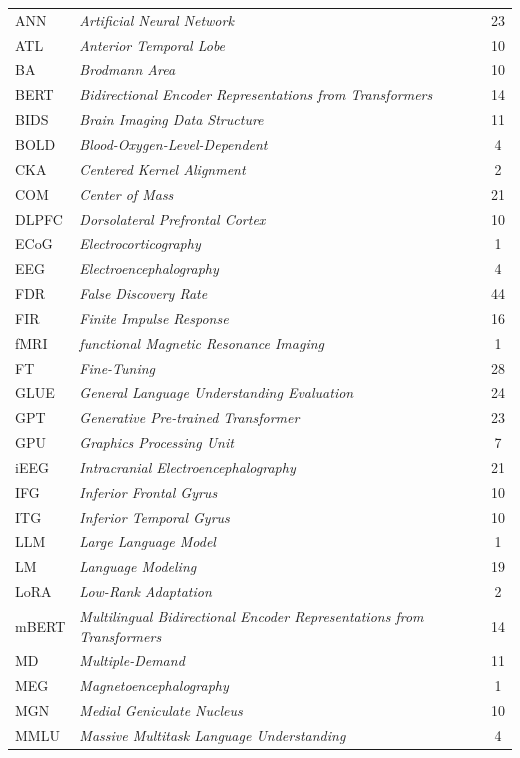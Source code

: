 \begin{longtable}{@{} l >{\raggedright\arraybackslash}p{7.5cm} c @{}}
ANN & \textit{Artificial Neural Network} & 23 \\
ATL & \textit{Anterior Temporal Lobe} & 10 \\
BA & \textit{Brodmann Area} & 10 \\
BERT & \textit{Bidirectional Encoder Representations from Transformers} & 14 \\
BIDS & \textit{Brain Imaging Data Structure} & 11 \\
BOLD & \textit{Blood-Oxygen-Level-Dependent} & 4 \\
CKA & \textit{Centered Kernel Alignment} & 2 \\
COM & \textit{Center of Mass} & 21 \\
DLPFC & \textit{Dorsolateral Prefrontal Cortex} & 10 \\
ECoG & \textit{Electrocorticography} & 1 \\
EEG & \textit{Electroencephalography} & 4 \\
FDR & \textit{False Discovery Rate} & 44 \\
FIR & \textit{Finite Impulse Response} & 16 \\
fMRI & \textit{functional Magnetic Resonance Imaging} & 1 \\
FT & \textit{Fine-Tuning} & 28 \\
GLUE & \textit{General Language Understanding Evaluation} & 24 \\
GPT & \textit{Generative Pre-trained Transformer} & 23 \\
GPU & \textit{Graphics Processing Unit} & 7 \\
iEEG & \textit{Intracranial Electroencephalography} & 21 \\
IFG & \textit{Inferior Frontal Gyrus} & 10 \\
ITG & \textit{Inferior Temporal Gyrus} & 10 \\
LLM & \textit{Large Language Model} & 1 \\
LM & \textit{Language Modeling} & 19 \\
LoRA & \textit{Low-Rank Adaptation} & 2 \\
mBERT & \textit{Multilingual Bidirectional Encoder Representations from Transformers} & 14 \\
MD & \textit{Multiple-Demand} & 11 \\
MEG & \textit{Magnetoencephalography} & 1 \\
MGN & \textit{Medial Geniculate Nucleus} & 10 \\
MMLU & \textit{Massive Multitask Language Understanding} & 4 \\

\end{longtable}
